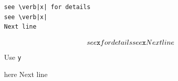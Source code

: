 \begin{verbatim}
see \verb|x| for details
see \verb|x|
Next line
\end{verbatim}
\[
see \verb|x| for details
see \verb|x|
Next line
\]
Use \verb|y|

here
Next line

